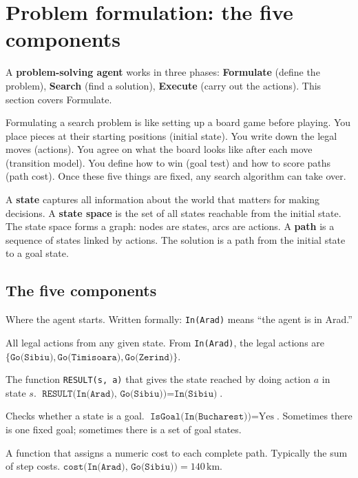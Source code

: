 \documentclass[a4paper,11pt]{article}
\newcommand{\vocab}[1]{\textbf{\color{navy}#1}}
\begin{document}
\section{Problem formulation: the five components}

A \vocab{problem-solving agent} works in three phases:
\textbf{Formulate} (define the problem), \textbf{Search} (find a solution),
\textbf{Execute} (carry out the actions). This section covers Formulate.

\begin{intuition}
Formulating a search problem is like setting up a board game before playing.
You place pieces at their starting positions (initial state).
You write down the legal moves (actions).
You agree on what the board looks like after each move (transition model).
You define how to win (goal test) and how to score paths (path cost).
Once these five things are fixed, any search algorithm can take over.
\end{intuition}

A \vocab{state} captures all information about the world that matters for making
decisions. A \vocab{state space} is the set of all states reachable from the
initial state. The state space forms a graph: nodes are states, arcs are actions.
A \vocab{path} is a sequence of states linked by actions. The solution is a path
from the initial state to a goal state.

\subsection{The five components}

\begin{description}[leftmargin=7.5em,style=nextline,font=\normalfont\bfseries\color{navy}]
  \item[Initial state] Where the agent starts. Written formally: \texttt{In(Arad)}
    means ``the agent is in Arad.''
  \item[Possible actions] All legal actions from any given state.
    From \texttt{In(Arad)}, the legal actions are
    $\{\texttt{Go(Sibiu)}, \texttt{Go(Timisoara)}, \texttt{Go(Zerind)}\}$.
  \item[Transition model] The function \texttt{RESULT(s, a)} that gives the state
    reached by doing action $a$ in state $s$.
    $\texttt{RESULT(In(Arad), Go(Sibiu))} = \texttt{In(Sibiu)}$.
  \item[Goal test] Checks whether a state is a goal.
    $\texttt{IsGoal(In(Bucharest))} = \text{Yes}$.
    Sometimes there is one fixed goal; sometimes there is a set of goal states.
  \item[Path cost] A function that assigns a numeric cost to each complete path.
    Typically the sum of step costs.
    $\texttt{cost(In(Arad), Go(Sibiu))} = 140\,\text{km}$.
\end{description}
\end{document}
